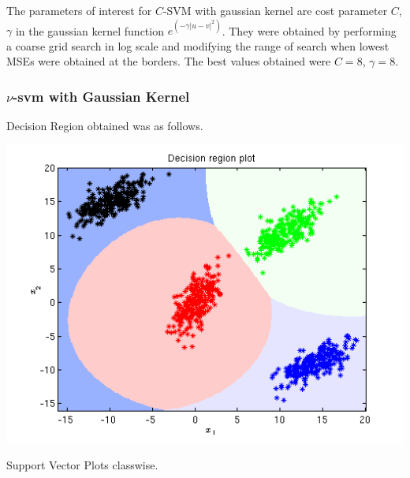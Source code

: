 \documentclass{article}
\begin{document}
The parameters of interest for $C$-SVM with gaussian kernel are cost parameter $C$, $\gamma$ in the gaussian kernel function $e^{(-\gamma|u-v|^{2})}$. They were obtained by performing a coarse grid search in log scale and modifying the range of search when lowest MSEs were obtained at the borders.
The best values obtained were $C=8$, $\gamma=8$.


\subsubsection{$\nu$-svm with Gaussian Kernel}
Decision Region obtained was as follows.
\begin{center}
\includegraphics[scale=1]{Classification/1a/nu_g/dec}
\end{center}
Support Vector Plots classwise.
\end{document}
